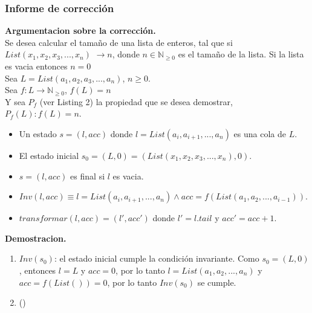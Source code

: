 \documentclass[12pt, a4paper]{article}
\begin{document}
\subsubsection{Informe de corrección}
\textbf{Argumentacion sobre la corrección.}\\
Se desea calcular el tamaño de una lista de enteros, tal que si $List(x_1,x_2,x_3,...,x_n)$ $\rightarrow n$, donde $n \in \mathbb{N}_{\geq 0}$ es el tamaño de la lista. Si la lista es vacia entonces $n=0$\\
Sea $L=List(a_1,a_2,a_3,...,a_n)$, $n\geq0$. \\
Sea $f:L \rightarrow \mathbb{N}_{\geq 0}$, $f(L)=n$\\
Y sea $P_f$ (ver Listing 2) la propiedad que se desea demostrar, $P_f(L):f(L)=n$.\\
\begin{itemize}
  \item Un estado $s=(l,acc)$ donde $l=List(a_i,a_{i+1},...,a_n)$ es una cola de $L$.
  \item El estado inicial $s_0=(L,0)=(List(x_1,x_2,x_3,...,x_n),0)$.
  \item $s = (l,acc)$ es final si $l$ es vacia.
  \item $Inv(l,acc)\equiv l = List(a_i,a_{i+1},...,a_n) \wedge acc = f(List(a_1,a_2,...,a_{i-1}))$.
  \item $transformar(l,acc) = (l',acc')$ donde $l'=l.tail$ y $acc'=acc+1$. 
\end{itemize}
\textbf{Demostracion.}\\
\begin{enumerate}
  \item $Inv(s_0)$: el estado inicial cumple la condición invariante. Como $s_0=(L,0)$, entonces $l=L$ y $acc=0$, por lo tanto $l=List(a_1,a_2,...,a_n)$ y $acc=f(List())=0$, por lo tanto $Inv(s_0)$ se cumple.%
  \item ()
\end{enumerate}
\end{document}
